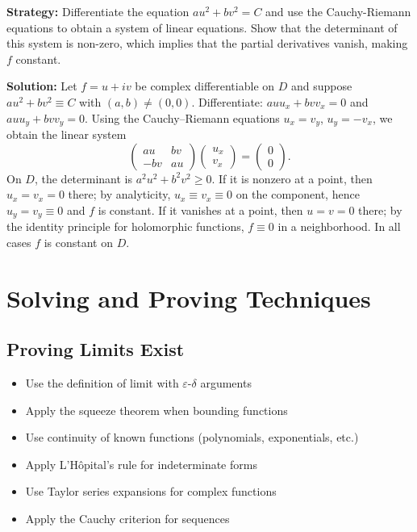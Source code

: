 \noindent\textbf{Strategy:} Differentiate the equation \( au^2 + bv^2 = C \) and use the Cauchy-Riemann equations to obtain a system of linear equations. Show that the determinant of this system is non-zero, which implies that the partial derivatives vanish, making \( f \) constant.

\bigskip\noindent\textbf{Solution:}
Let $f=u+iv$ be complex differentiable on $D$ and suppose $au^2+bv^2\equiv C$ with $(a,b)\ne (0,0)$. Differentiate: $auu_x+bvv_x=0$ and $auu_y+bvv_y=0$. Using the Cauchy–Riemann equations $u_x=v_y$, $u_y=-v_x$, we obtain the linear system
\[\begin{pmatrix}au&bv\\ -bv&au\end{pmatrix}\begin{pmatrix}u_x\\ v_x\end{pmatrix}=\begin{pmatrix}0\\ 0\end{pmatrix}.\]
On $D$, the determinant is $a^2u^2+b^2v^2\ge 0$. If it is nonzero at a point, then $u_x=v_x=0$ there; by analyticity, $u_x\equiv v_x\equiv 0$ on the component, hence $u_y=v_y\equiv 0$ and $f$ is constant. If it vanishes at a point, then $u=v=0$ there; by the identity principle for holomorphic functions, $f\equiv 0$ in a neighborhood. In all cases $f$ is constant on $D$.

\section{Solving and Proving Techniques}

\subsection*{Proving Limits Exist}
\begin{itemize}
\item Use the definition of limit with $\varepsilon$-$\delta$ arguments
\item Apply the squeeze theorem when bounding functions
\item Use continuity of known functions (polynomials, exponentials, etc.)
\item Apply L'Hôpital's rule for indeterminate forms
\item Use Taylor series expansions for complex functions
\item Apply the Cauchy criterion for sequences
\end{itemize}

